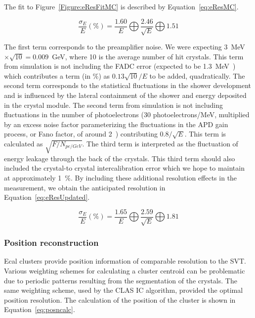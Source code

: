 \documentclass[12pt]{report}
\begin{document}
The fit to Figure~\ref{Figure:eResFitMC} is described by Equation~\ref{eq:eResMC}.

\begin{equation}
\label{eq:eResMC}
\dfrac{\sigma_E}{E} (\%) = \dfrac{1.60}{E} \bigoplus \dfrac{2.46}{\sqrt{E}} \bigoplus 1.51 
\end{equation}

The first term corresponds to the preamplifier noise. We were expecting 3~MeV$\times \sqrt{10} = 0.009$~GeV, where 10 is the average number of hit crystals. This term from simulation is not including the FADC error (expected to be 1.3~MeV~\cite{Charles}) which contributes a term (in $\%$) as $0.13\sqrt{10}/E$ to be added, quadratically. The second term corresponds to the statistical fluctuations in the shower development and is influenced by the lateral containment of the shower and energy deposited in the crystal module. The second term from simulation is not including fluctuations in the number of photoelectrons (30 photoelectrons/MeV, multiplied by an excess noise factor parameterizing the fluctuations in the APD gain process, or Fano factor, of around 2~\cite{panda}) contributing $0.8/\sqrt{E}$. This term is calculated as $\sqrt{F/N_{pe/GeV}}$. The third term is interpreted as the fluctuation of energy leakage through the back of the crystals. This third term should also included the crystal-to crystal intercalibration error which we hope to maintain at approximately 1~$\%$. By including these additional resolution effects in the measurement, we obtain the anticipated resolution in Equation~\eqref{eq:eResUpdated}.

\begin{equation}
\label{eq:eResUpdated}
\dfrac{\sigma_E}{E} (\%) = \dfrac{1.65}{E} \bigoplus \dfrac{2.59}{\sqrt{E}} \bigoplus 1.81 
\end{equation}

\subsubsection{Position reconstruction}
\indent Ecal clusters provide position information of comparable resolution to the SVT. Various weighting schemes for calculating a cluster centroid can be problematic due to periodic patterns resulting from the segmentation of the crystals. The same weighting scheme, used by the CLAS IC algorithm, provided the optimal position resolution. The calculation of the position of the cluster is shown in Equation~\eqref{eq:posncalc}.
\end{document}

